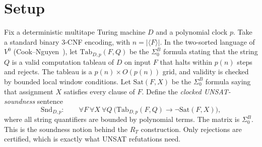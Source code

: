 \documentclass[11pt]{article}
\theoremstyle{definition}
\newcommand{\Snd}{\mathrm{Snd}}
\begin{document}
\section{Setup}
Fix a deterministic multitape Turing machine $D$ and a polynomial clock $p$. Take a standard
binary 3-CNF encoding, with $n=|\langle F\rangle|$. In the two-sorted language of $V^0$
(Cook--Nguyen~\cite{CN10}), let $\mathrm{Tab}_{D,p}(F,Q)$ be the $\Sigma^B_0$ formula stating that
the string $Q$ is a valid computation tableau of $D$ on input $F$ that halts within $p(n)$ steps and rejects.
The tableau is a $p(n)\times O(p(n))$ grid, and validity is checked by bounded local window
conditions. Let $\mathrm{Sat}(F,X)$ be the $\Sigma^B_0$ formula saying that assignment $X$ satisfies
every clause of $F$. Define the \emph{clocked UNSAT-soundness} sentence
\[
\Snd_{D,p}:\qquad \forall F\ \forall X\ \forall Q\ \big(\mathrm{Tab}_{D,p}(F,Q)\rightarrow\neg\mathrm{Sat}(F,X)\big),
\]
where all string quantifiers are bounded by polynomial terms. The matrix is $\Sigma^B_0$.
This is the soundness notion behind the $R_T$ construction. Only rejections are
certified, which is exactly what UNSAT refutations need.
\end{document}
